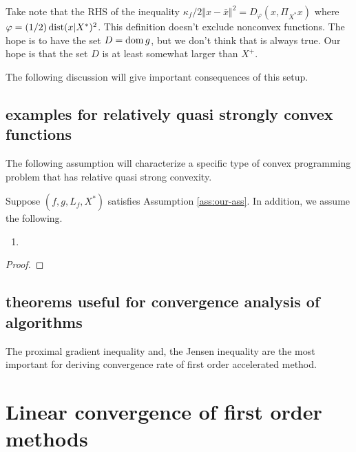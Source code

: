 \documentclass[12pt]{article}
\begin{document}
    \begin{remark}
        Take note that the RHS of the inequality $\kappa_f/2 \Vert x - \bar x\Vert^2 = D_\varphi(x, \Pi_{X^*}x)$ where $\varphi = (1/2)\operatorname{dist}(x | X^*)^2$. 
        This definition doesn't exclude nonconvex functions. 
        The hope is to have the set $D = \operatorname{dom} g$, but we don't think that is always true. 
        Our hope is that the set $D$ is at least somewhat larger than $X^+$. 
    \end{remark}
    The following discussion will give important consequences of this setup. 
    \subsection{examples for relatively quasi strongly convex functions}
        The following assumption will characterize a specific type of convex programming problem that has relative quasi strong convexity. 
        \begin{assumption}
            Suppose $(f, g, L_f, X^*)$ satisfies Assumption \ref{ass:our-ass}. 
            In addition, we assume the following. 
            \begin{enumerate}[nosep]
                \item 
            \end{enumerate}
        \end{assumption}
        \begin{theorem}\label{thm:example-rqua}
            
        \end{theorem}
        \begin{proof}
            
        \end{proof}
    \subsection{theorems useful for convergence analysis of algorithms}
        The proximal gradient inequality and, the Jensen inequality are the most important for deriving convergence rate of first order accelerated method. 

\section{Linear convergence of first order methods}
    

    






\end{document}
